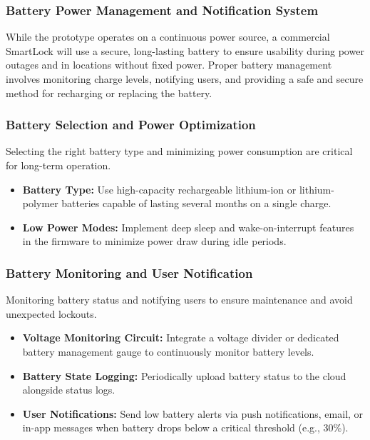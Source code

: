 \subsubsection{Battery Power Management and Notification System}

While the prototype operates on a continuous power source, a commercial SmartLock will use a secure, long-lasting battery to ensure usability during power outages and in locations without fixed power. Proper battery management involves monitoring charge levels, notifying users, and providing a safe and secure method for recharging or replacing the battery.

\subsubsection*{Battery Selection and Power Optimization}

Selecting the right battery type and minimizing power consumption are critical for long-term operation.

\begin{itemize}
  \item \textbf{Battery Type:} Use high-capacity rechargeable lithium-ion or lithium-polymer batteries capable of lasting several months on a single charge.
  \item \textbf{Low Power Modes:} Implement deep sleep and wake-on-interrupt features in the firmware to minimize power draw during idle periods.
\end{itemize}

\subsubsection*{Battery Monitoring and User Notification}

Monitoring battery status and notifying users to ensure maintenance and avoid unexpected lockouts.

\begin{itemize}
  \item \textbf{Voltage Monitoring Circuit:} Integrate a voltage divider or dedicated battery management gauge to continuously monitor battery levels.
  \item \textbf{Battery State Logging:} Periodically upload battery status to the cloud alongside status logs.
  \item \textbf{User Notifications:} Send low battery alerts via push notifications, email, or in-app messages when battery drops below a critical threshold (e.g., 30\%).
\end{itemize}

